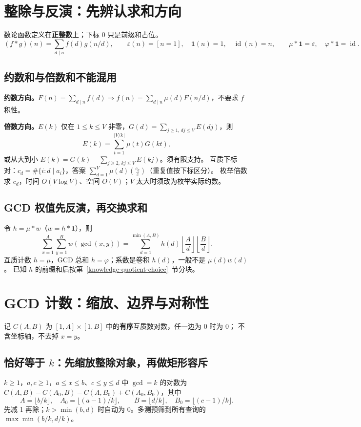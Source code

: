 \section{整除与反演：先辨认求和方向}\label{knowledge-mobius-model}
数论函数定义在\textbf{正整数}上；下标 0 只是前缀和占位。
\[
(f*g)(n)=\sum_{d\mid n}f(d)g(n/d),\qquad
\varepsilon(n)=[n=1],\quad \mathbf1(n)=1,\quad \operatorname{id}(n)=n,
\qquad \mu*\mathbf1=\varepsilon,\quad \varphi*\mathbf1=\operatorname{id}.
\]

\subsection{约数和与倍数和不能混用}
\textbf{约数方向。}$F(n)=\sum_{d\mid n}f(d)\Rightarrow f(n)=\sum_{d\mid n}\mu(d)F(n/d)$，不要求 $f$ 积性。

\textbf{倍数方向。}$E(k)$ 仅在 $1\le k\le V$ 非零，$G(d)=\sum_{j\ge1,\,dj\le V}E(dj)$，则
\[
E(k)=\sum_{t=1}^{\lfloor V/k\rfloor}\mu(t)G(kt),
\]
或从大到小 $E(k)=G(k)-\sum_{j\ge2,\,kj\le V}E(kj)$。须有限支持。
互质下标对：$c_d=\#\{i:d\mid a_i\}$，答案 $\sum_{d=1}^V\mu(d)\binom{c_d}{2}$（重复值按下标区分）。
枚举倍数求 $c_d$，时间 $O(V\log V)$、空间 $O(V)$；$V$ 太大时须改为枚举实际约数。

\subsection{GCD 权值先反演，再交换求和}
令 $h=\mu*w$（$w=h*\mathbf1$），则
\[
\sum_{x=1}^A\sum_{y=1}^B w(\gcd(x,y))
=\sum_{d=1}^{\min(A,B)}h(d)
\left\lfloor\frac Ad\right\rfloor\left\lfloor\frac Bd\right\rfloor.
\]
互质计数 $h=\mu$，GCD 总和 $h=\varphi$；系数是卷积 $h(d)$，一般不是 $\mu(d)w(d)$。
已知 $h$ 的前缀和后按第~\ref{knowledge-quotient-choice}~节分块。

\section{GCD 计数：缩放、边界与对称性}\label{knowledge-gcd-domains}
记 $C(A,B)$ 为 $[1,A]\times[1,B]$ 中的\textbf{有序}互质数对数，任一边为 0 时为 0；
不含坐标轴，不去掉 $x=y$。

\subsection{恰好等于 \texorpdfstring{$k$}{k}：先缩放整除对象，再做矩形容斥}
$k\ge1$，$a,c\ge1$，$a\le x\le b$、$c\le y\le d$ 中 $\gcd=k$ 的对数为
$C(A,B)-C(A_0,B)-C(A,B_0)+C(A_0,B_0)$，其中
\[
A=\lfloor b/k\rfloor,\quad A_0=\lfloor(a-1)/k\rfloor,\qquad
B=\lfloor d/k\rfloor,\quad B_0=\lfloor(c-1)/k\rfloor.
\]
先减 1 再除；$k>\min(b,d)$ 时自动为 0。多测预筛到所有查询的 $\max\min(b/k,d/k)$。


